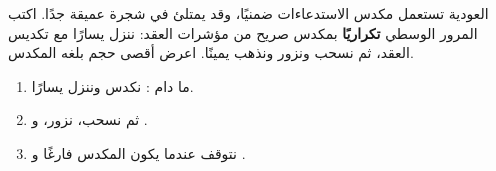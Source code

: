 \begin{statement}
العودية تستعمل مكدس الاستدعاءات ضمنيًا، وقد يمتلئ في شجرة عميقة جدًا. اكتب المرور الوسطي \textbf{تكراريًا} بمكدس صريح من مؤشرات العقد: ننزل يسارًا مع تكديس العقد، ثم نسحب ونزور ونذهب يمينًا. اعرض أقصى حجم بلغه المكدس.
\end{statement}
\begin{stepsbox}\begin{enumerate}
\item ما دام : نكدس وننزل يسارًا.
\item ثم نسحب، نزور، و .
\item نتوقف عندما يكون المكدس فارغًا و .
\end{enumerate}\end{stepsbox}
